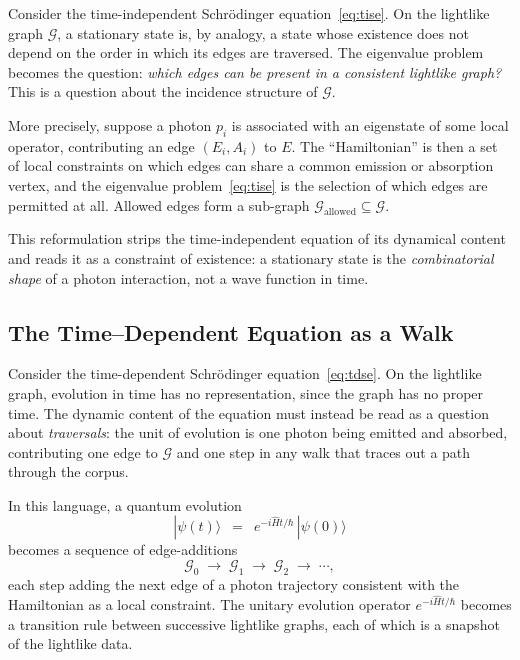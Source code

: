 \documentclass[11pt]{article}
\newcommand{\ket}[1]{|#1\rangle}
\begin{document}
Consider the time-independent Schr\"odinger equation~\eqref{eq:tise}. On the lightlike graph $\mathcal{G}$, a stationary state is, by analogy, a state whose existence does not depend on the order in which its edges are traversed. The eigenvalue problem becomes the question: \emph{which edges can be present in a consistent lightlike graph?} This is a question about the incidence structure of $\mathcal{G}$.

More precisely, suppose a photon $p_i$ is associated with an eigenstate of some local operator, contributing an edge $(E_i, A_i)$ to $E$. The ``Hamiltonian'' is then a set of local constraints on which edges can share a common emission or absorption vertex, and the eigenvalue problem~\eqref{eq:tise} is the selection of which edges are permitted at all. Allowed edges form a sub-graph $\mathcal{G}_{\mathrm{allowed}} \subseteq \mathcal{G}$.

This reformulation strips the time-independent equation of its dynamical content and reads it as a constraint of existence: a stationary state is the \emph{combinatorial shape} of a photon interaction, not a wave function in time.

\subsection{The Time--Dependent Equation as a Walk}

Consider the time-dependent Schr\"odinger equation~\eqref{eq:tdse}. On the lightlike graph, evolution in time has no representation, since the graph has no proper time. The dynamic content of the equation must instead be read as a question about \emph{traversals}: the unit of evolution is one photon being emitted and absorbed, contributing one edge to $\mathcal{G}$ and one step in any walk that traces out a path through the corpus.

In this language, a quantum evolution
\begin{equation}
\ket{\psi(t)} \;\:=\;\: e^{-i\hat{H}t/\hbar}\,\ket{\psi(0)}
\label{eq:evolution-again}
\end{equation}
becomes a sequence of edge-additions
\begin{equation}
\mathcal{G}_0 \;\to\; \mathcal{G}_1 \;\to\; \mathcal{G}_2 \;\to\;\cdots,
\label{eq:graph-walk}
\end{equation}
each step adding the next edge of a photon trajectory consistent with the Hamiltonian as a local constraint. The unitary evolution operator $e^{-i\hat{H}t/\hbar}$ becomes a transition rule between successive lightlike graphs, each of which is a snapshot of the lightlike data.
\end{document}
